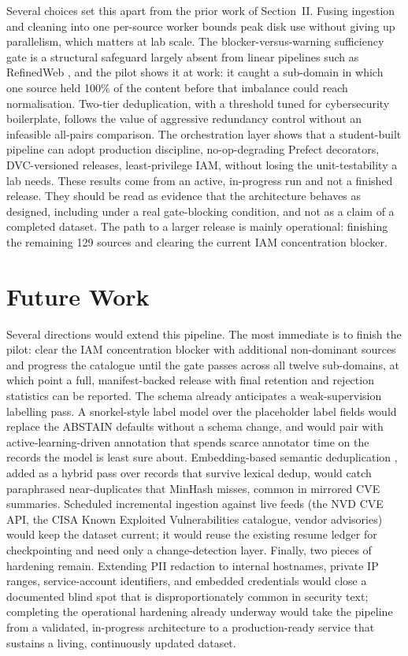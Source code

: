 \documentclass[conference]{IEEEtran}
\begin{document}
Several choices set this apart from the prior work of Section~II.
Fusing ingestion and cleaning into one per-source worker bounds peak
disk use without giving up parallelism, which matters at lab scale. The
blocker-versus-warning sufficiency gate is a structural safeguard
largely absent from linear pipelines such as RefinedWeb
\cite{penedo2023refinedweb}, and the pilot shows it at work: it caught a
sub-domain in which one source held 100\% of the content before that
imbalance could reach normalisation. Two-tier deduplication, with a
threshold tuned for cybersecurity boilerplate, follows the value of
aggressive redundancy control \cite{lee2022deduplication} without an
infeasible all-pairs comparison. The orchestration layer shows that a
student-built pipeline can adopt production discipline, no-op-degrading
Prefect decorators, DVC-versioned releases, least-privilege IAM,
without losing the unit-testability a lab needs. These results come from
an active, in-progress run and not a finished release. They should be
read as evidence that the architecture behaves as designed, including
under a real gate-blocking condition, and not as a claim of a completed
dataset. The path to a larger release is mainly operational: finishing
the remaining 129 sources and clearing the current IAM concentration
blocker.

\section{Future Work}

Several directions would extend this pipeline. The most immediate is to
finish the pilot: clear the IAM concentration blocker with additional
non-dominant sources and progress the catalogue until the gate passes
across all twelve sub-domains, at which point a full, manifest-backed
release with final retention and rejection statistics can be reported.
The schema already anticipates a weak-supervision labelling pass. A
snorkel-style label model over the placeholder label fields would
replace the ABSTAIN defaults without a schema change, and would pair
with active-learning-driven annotation that spends scarce annotator time
on the records the model is least sure about. Embedding-based semantic
deduplication \cite{abbas2023semdedup}, added as a hybrid pass over
records that survive lexical dedup, would catch paraphrased
near-duplicates that MinHash misses, common in mirrored CVE summaries.
Scheduled incremental ingestion against live feeds (the NVD CVE API,
the CISA Known Exploited Vulnerabilities catalogue, vendor advisories)
would keep the dataset current; it would reuse the existing resume
ledger for checkpointing and need only a change-detection layer.
Finally, two pieces of hardening remain. Extending PII redaction to
internal hostnames, private IP ranges, service-account identifiers, and
embedded credentials would close a documented blind spot that is
disproportionately common in security text; completing the operational
hardening already underway would take the pipeline from a validated,
in-progress architecture to a production-ready service that sustains a
living, continuously updated dataset.
\end{document}
